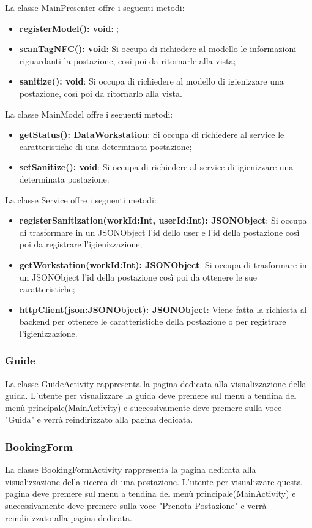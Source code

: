 La classe MainPresenter offre i seguenti metodi:
\begin{itemize}
	\item \textbf{registerModel(): void}: ; 
	\item \textbf{scanTagNFC(): void}: Si occupa di richiedere al modello le informazioni riguardanti la postazione, così poi da ritornarle alla vista; 
	\item \textbf{sanitize(): void}: Si occupa di richiedere al modello di igienizzare una postazione, così poi da ritornarlo alla vista. 
\end{itemize}

La classe MainModel offre i seguenti metodi:
\begin{itemize}
	\item \textbf{getStatus(): DataWorkstation}: Si occupa di richiedere al service le caratteristiche di una determinata postazione;
	\item \textbf{setSanitize(): void}: Si occupa di richiedere al service di igienizzare una determinata postazione.
\end{itemize}

La classe Service offre i seguenti metodi:
\begin{itemize}
	\item \textbf{registerSanitization(workId:Int, userId:Int): JSONObject}: Si occupa di trasformare in un JSONObject l'id dello user e l'id della postazione così poi da registrare l'igienizzazione;
	\item \textbf{getWorkstation(workId:Int): JSONObject}: Si occupa di trasformare in un JSONObject l'id della postazione così poi da ottenere le sue caratteristiche;
	\item \textbf{httpClient(json:JSONObject): JSONObject}: Viene fatta la richiesta al backend per ottenere le caratteristiche della postazione o per registrare l'igienizzazione.	
\end{itemize}

\subsubsection{Guide}
La classe GuideActivity rappresenta la pagina dedicata alla visualizzazione della guida.
L'utente per visualizzare la guida deve premere sul menu a tendina del menù principale(MainActivity) e successivamente deve premere sulla voce "Guida" e verrà reindirizzato alla pagina dedicata.

\subsubsection{BookingForm}
La classe BookingFormActivity rappresenta la pagina dedicata alla visualizzazione della ricerca di una postazione.
L'utente per visualizzare questa pagina deve premere sul menu a tendina del menù principale(MainActivity) e successivamente deve premere sulla voce "Prenota Postazione" e verrà reindirizzato alla pagina dedicata.

